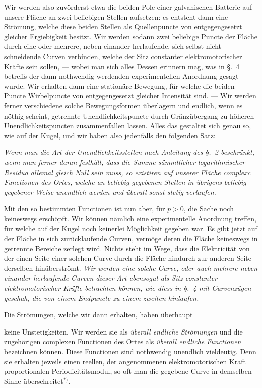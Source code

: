 \documentclass{article}
\begin{document}
Wir werden also zuvörderst etwa die beiden Pole einer galvanischen Batterie auf unsere Fläche an zwei beliebigen Stellen aufsetzen: es entsteht dann eine Strömung, welche diese beiden Stellen als Quellenpuncte von entgegengesetzt gleicher Ergiebigkeit besitzt. Wir werden sodann zwei beliebige Puncte der Fläche durch eine oder mehrere, neben einander herlaufende, sich selbst nicht schneidende Curven verbinden, welche der Sitz constanter elektromotorischer Kräfte sein sollen, --- wobei man sich alles Dessen erinnern mag, was in §.~4 betreffs der dann nothwendig werdenden experimentellen Anordnung gesagt wurde. Wir erhalten dann eine stationäre Bewegung, für welche die beiden Puncte Wirbelpuncte von entgegengesetzt gleicher Intensität sind. --- Wir werden ferner verschiedene solche Bewegungsformen überlagern und endlich, wenn es nöthig scheint, getrennte Unendlichkeitspuncte durch Gränzübergang zu höheren Unendlichkeitspuncten zusammenfallen lassen. Alles das gestaltet sich genau so, wie auf der Kugel, und wir haben also jedenfalls den folgenden Satz:

\emph{Wenn man die Art der Unendlichkeitsstellen nach Anleitung des §.~2 beschränkt, wenn man ferner daran festhält, dass die Summe sämmtlicher logarithmischer Residua allemal gleich Null sein muss, so existiren auf unserer Fläche complexc Functionen des Ortes, welche an beliebig gegebenen Stellen in übrigens beliebig gegebener Weise unendlich werden und überall sonst stetig verlaufen.}

Mit den so bestimmten Functionen ist nun aber, für $p > 0$, die Sache noch keineswegs erschöpft. Wir können nämlich eine experimentelle Anordnung treffen, für welche auf der Kugel noch keinerlei Möglichkeit gegeben war. Es gibt jetzt auf der Fläche in sich zurücklaufende Curven, vermöge deren die Fläche keineswegs in getrennte Bereiche zerlegt wird. Nichts steht im Wege, dass die Elektricität von der einen Seite einer solchen Curve durch die Fläche hindurch zur anderen Seite derselben hinüberströmt. \emph{Wir werden eine solche Curve, oder auch mehrere neben einander herlaufende Curven dieser Art ebensogut als Sitz constanter elektromotorischer Kräfte betrachten können, wie diess in §.~4 mit Curvenzügen geschah, die von einem Endpuncte zu einem zweiten hinlaufen.}

Die Strömungen, welche wir dann erhalten, haben überhaupt

keine Unstetigkeiten. Wir werden sie als \emph{überall endliche Strömungen} und die zugehörigen complexen Functionen des Ortes als \emph{überall endliche Functionen} bezeichnen können. Diese Functionen sind nothwendig unendlich vieldeutig. Denn sie erhalten jeweils einen reellen, der angenommenen elektromotorischen Kraft proportionalen Periodicitätsmodul, so oft man die gegebene Curve in demselben Sinne überschreitet${}^{*)}$.
\end{document}
